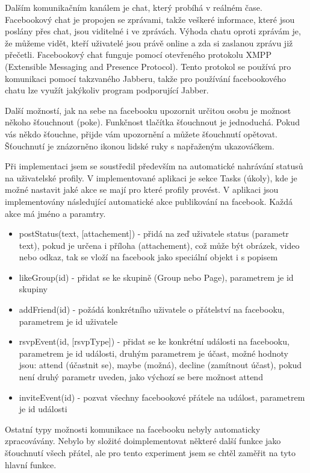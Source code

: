 \documentclass[thesis=M,czech]{FITthesis}[2013/05/10]
\begin{document}
Dalším komunikačním kanálem je chat, který probíhá v reálném čase. Facebookový chat je propojen se zprávami, takže veškeré informace, které jsou poslány přes chat, jsou viditelné i ve zprávách. Výhoda chatu oproti zprávám je, že  můžeme vidět, kteří uživatelé jsou právě online a zda si zaslanou zprávu již přečetli. Facebookový chat funguje pomocí otevřeného protokolu XMPP (Extensible Messaging and Presence Protocol). Tento protokol se používá pro komunikaci pomocí takzvaného Jabberu, takže pro používání facebookového chatu lze využít jakýkoliv program podporující Jabber.

Další možností, jak na sebe na facebooku upozornit určitou osobu je možnost někoho šťouchnout (poke). Funkčnost tlačítka šťouchnout je jednoduchá. Pokud vás někdo šťouchne, přijde vám upozornění a můžete šťouchnutí opětovat. Šťouchnutí je znázorněno ikonou lidské ruky s napřaženým ukazováčkem.

Při implementaci jsem se soustředil především na automatické nahrávání statusů na uživatelské profily. V implementované aplikaci je sekce Tasks (úkoly), kde je možné nastavit jaké akce se mají pro které profily provést. V aplikaci jsou implementovány následující automatické akce publikování na facebook. Každá akce má jméno a paramtry.

\begin{itemize}
  \item postStatus(text, [attachement]) - přidá na zeď uživatele status (parametr text), pokud je určena i příloha (attachement), což může být obrázek, video nebo odkaz, tak se vloží na facebook jako speciální objekt i s popisem
  \item likeGroup(id) - přidat se ke skupině (Group nebo Page), parametrem je id skupiny 
  \item addFriend(id) - požádá konkrétního uživatele o přátelství na facebooku, parametrem je id uživatele
  \item rsvpEvent(id, [rsvpType]) - přidat se ke konkrétní události na facebooku, parametrem je id události, druhým parametrem je účast, možné hodnoty jsou: attend (účastnit se), maybe (možná), decline (zamítnout účast), pokud není druhý parametr uveden, jako výchozí se bere možnost attend
  \item inviteEvent(id) - pozvat všechny facebookové přátele na událost, parametrem je id události
\end{itemize}

Ostatní typy možnosti komunikace na facebooku nebyly automaticky zpracovávány. Nebylo by složité doimplementovat některé další funkce jako šťouchnutí všech přátel, ale pro tento experiment jsem se chtěl zaměřit na tyto hlavní funkce. 
\end{document}
